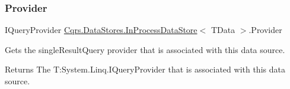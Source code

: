 \subsubsection{\texorpdfstring{Provider}{Provider}}
{\footnotesize\ttfamily I\+Query\+Provider \hyperlink{classCqrs_1_1DataStores_1_1InProcessDataStore}{Cqrs.\+Data\+Stores.\+In\+Process\+Data\+Store}$<$ T\+Data $>$.Provider\hspace{0.3cm}{\ttfamily [get]}}



Gets the single\+Result\+Query provider that is associated with this data source. 

\begin{DoxyReturn}{Returns}
The T\+:\+System.\+Linq.\+I\+Query\+Provider that is associated with this data source. 
\end{DoxyReturn}
